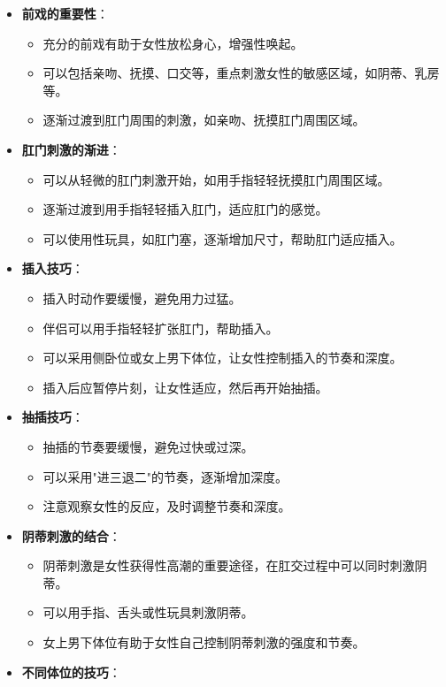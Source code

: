 \documentclass[12pt,UTF8]{ctexbook}
\begin{document}
\begin{itemize}
	\item \textbf{前戏的重要性}：
	\begin{itemize}
		\item 充分的前戏有助于女性放松身心，增强性唤起。
		\item 可以包括亲吻、抚摸、口交等，重点刺激女性的敏感区域，如阴蒂、乳房等。
		\item 逐渐过渡到肛门周围的刺激，如亲吻、抚摸肛门周围区域。
	\end{itemize}
	\item \textbf{肛门刺激的渐进}：
	\begin{itemize}
		\item 可以从轻微的肛门刺激开始，如用手指轻轻抚摸肛门周围区域。
		\item 逐渐过渡到用手指轻轻插入肛门，适应肛门的感觉。
		\item 可以使用性玩具，如肛门塞，逐渐增加尺寸，帮助肛门适应插入。
	\end{itemize}
	\item \textbf{插入技巧}：
	\begin{itemize}
		\item 插入时动作要缓慢，避免用力过猛。
		\item 伴侣可以用手指轻轻扩张肛门，帮助插入。
		\item 可以采用侧卧位或女上男下体位，让女性控制插入的节奏和深度。
		\item 插入后应暂停片刻，让女性适应，然后再开始抽插。
	\end{itemize}
	\item \textbf{抽插技巧}：
	\begin{itemize}
		\item 抽插的节奏要缓慢，避免过快或过深。
		\item 可以采用"进三退二"的节奏，逐渐增加深度。
		\item 注意观察女性的反应，及时调整节奏和深度。
	\end{itemize}
	\item \textbf{阴蒂刺激的结合}：
	\begin{itemize}
		\item 阴蒂刺激是女性获得性高潮的重要途径，在肛交过程中可以同时刺激阴蒂。
		\item 可以用手指、舌头或性玩具刺激阴蒂。
		\item 女上男下体位有助于女性自己控制阴蒂刺激的强度和节奏。
	\end{itemize}
	\item \textbf{不同体位的技巧}：
	\begin{itemize}

\end{itemize}
\end{itemize}
\end{document}
